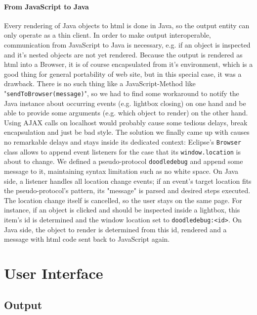 \documentclass[a4paper,ngerman,english]{amsbook} %
\begin{document}
\subsubsection*{From JavaScript to Java}
Every rendering of Java objects to html is done in Java, so the output entity can only operate as a thin client.
In order to make output interoperable, communication from JavaScript to Java is necessary, e.g. if an object is inspected and it's nested objects are not yet rendered. Because the output is rendered as html into a Browser, it is of course encapsulated from it's environment, which is a good thing for general portability of web site, but in this special case, it was a drawback. There is no such thing like a JavaScript-Method like "\verb.sendToBrowser(message).", so we had to find some workaround to notify the Java instance about occurring events (e.g. lightbox closing) on one hand and be able to provide some arguments (e.g. which object to render) on the other hand. Using AJAX calls on localhost would probably cause some tedious delays, break encapsulation and just be bad style. The solution we finally came up with causes no remarkable delays and stays inside its dedicated context: Eclipse's \verb.Browser. class allows to append event listeners for the case that its \verb-window.location- is about to change. We defined a pseudo-protocol \verb-doodledebug- and append some message to it, maintaining syntax limitation such as no white space. On Java side, a listener handles all location change events; if an event's target location fits the pseudo-protocol's pattern, its "message" is parsed and desired steps executed. The location change itself is cancelled, so the user stays on the same page. For instance, if an object is clicked and should be inspected inside a lightbox, this item's id is determined and the window location set to \verb-doodledebug:<id>-. On Java side, the object to render is determined from this id, rendered and a message with html code sent back to JavaScript again.

\chapter*{User Interface}
\section*{Output}
\end{document}
